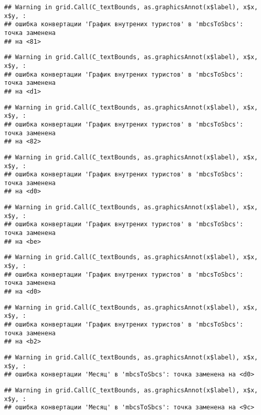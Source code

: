 \documentclass[
]{article}
\begin{document}
\begin{verbatim}
## Warning in grid.Call(C_textBounds, as.graphicsAnnot(x$label), x$x, x$y, :
## ошибка конвертации 'График внутрених туристов' в 'mbcsToSbcs': точка заменена
## на <81>
\end{verbatim}

\begin{verbatim}
## Warning in grid.Call(C_textBounds, as.graphicsAnnot(x$label), x$x, x$y, :
## ошибка конвертации 'График внутрених туристов' в 'mbcsToSbcs': точка заменена
## на <d1>
\end{verbatim}

\begin{verbatim}
## Warning in grid.Call(C_textBounds, as.graphicsAnnot(x$label), x$x, x$y, :
## ошибка конвертации 'График внутрених туристов' в 'mbcsToSbcs': точка заменена
## на <82>
\end{verbatim}

\begin{verbatim}
## Warning in grid.Call(C_textBounds, as.graphicsAnnot(x$label), x$x, x$y, :
## ошибка конвертации 'График внутрених туристов' в 'mbcsToSbcs': точка заменена
## на <d0>
\end{verbatim}

\begin{verbatim}
## Warning in grid.Call(C_textBounds, as.graphicsAnnot(x$label), x$x, x$y, :
## ошибка конвертации 'График внутрених туристов' в 'mbcsToSbcs': точка заменена
## на <be>
\end{verbatim}

\begin{verbatim}
## Warning in grid.Call(C_textBounds, as.graphicsAnnot(x$label), x$x, x$y, :
## ошибка конвертации 'График внутрених туристов' в 'mbcsToSbcs': точка заменена
## на <d0>
\end{verbatim}

\begin{verbatim}
## Warning in grid.Call(C_textBounds, as.graphicsAnnot(x$label), x$x, x$y, :
## ошибка конвертации 'График внутрених туристов' в 'mbcsToSbcs': точка заменена
## на <b2>
\end{verbatim}

\begin{verbatim}
## Warning in grid.Call(C_textBounds, as.graphicsAnnot(x$label), x$x, x$y, :
## ошибка конвертации 'Месяц' в 'mbcsToSbcs': точка заменена на <d0>
\end{verbatim}

\begin{verbatim}
## Warning in grid.Call(C_textBounds, as.graphicsAnnot(x$label), x$x, x$y, :
## ошибка конвертации 'Месяц' в 'mbcsToSbcs': точка заменена на <9c>
\end{verbatim}
\end{document}

